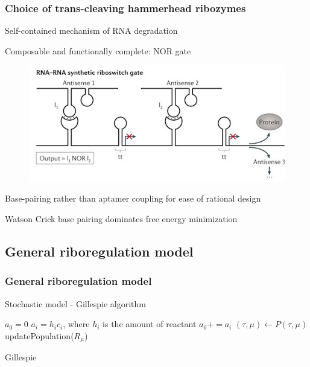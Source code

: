 \documentclass{beamer}
\begin{document}
\begin{frame}
\frametitle{Choice of trans-cleaving  hammerhead ribozymes}

Self-contained mechanism of RNA degradation

Composable and functionally complete: NOR gate

\begin{figure}
  \includegraphics[scale=0.25]{functional.png}
\end{figure}

Base-pairing rather than aptamer coupling for 
ease of rational design

Watson Crick base pairing dominates free energy minimization
\end{frame}


\subsection{General riboregulation model}
\begin{frame}
\frametitle{General riboregulation model}

Stochastic model - Gillespie algorithm


\begin{algorithm}[H]
\begin{algorithmic}[]
  \STATE $a_{0} = 0$
  \STATE $a_{i} = h_ic_i$, where $h_i$ is the amount of reactant
  \STATE $a_0 += a_{i}$
  \ENDFOR
  \STATE $(\tau,\mu) \leftarrow P(\tau,\mu)$
  \STATE updatePopulation($R_{\mu}$)
  \ENDWHILE
\end{algorithmic}
\caption{Gillespie}
\end{algorithm}

\end{frame}
\end{document}
